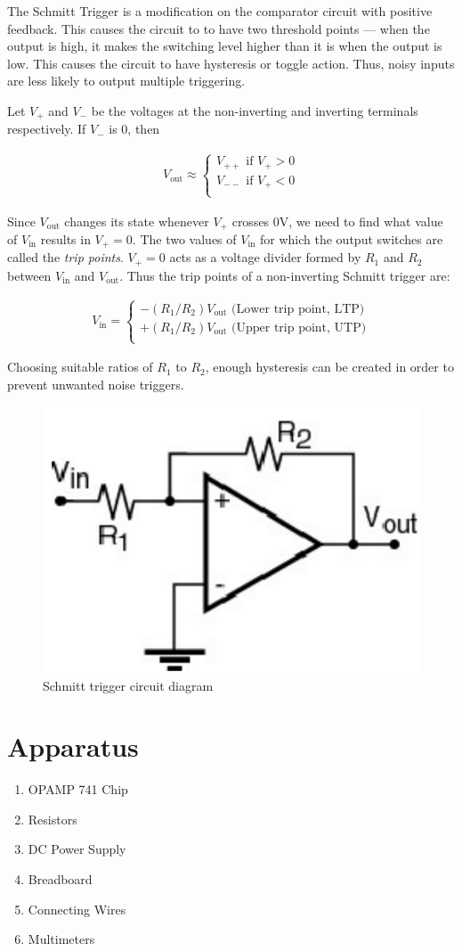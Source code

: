 The Schmitt Trigger is a modification on the comparator circuit with positive feedback. This causes the circuit to to have two threshold points --- when the output is high, it makes the switching level higher than it is when the output is low. This causes the circuit to have hysteresis or toggle action.
Thus, noisy inputs are less likely to output multiple triggering.

Let $V_+$ and $V_-$ be the voltages at the non-inverting and inverting terminals respectively. If $V_-$ is 0, then

\begin{align}
    V_\text{out} \approx \begin{cases}
        V_{++} \text{ if } V_+ > 0\\
        V_{--} \text{ if } V_+ < 0\\
    \end{cases}
\end{align}

Since $V_\text{out}$ changes its state whenever $V_+$ crosses 0V, we need to find what value of $V_\text{in}$ results in $V_+ = 0$. The two values of $V_\text{in}$ for which the output switches are called the \textit{trip points}. $V_+ = 0$ acts as a voltage divider formed by $R_1$ and $R_2$ between $V_\text{in}$ and $V_\text{out}$. Thus the trip points of a non-inverting Schmitt trigger are: 

\begin{align}
    V_\text{in} = \begin{cases}
        -(R_1/R_2)V_\text{out} \text{ (Lower trip point, LTP)}\\
        +(R_1/R_2)V_\text{out} \text{ (Upper trip point, UTP)}\\
    \end{cases}
\end{align}

Choosing suitable ratios of $R_1$ to $R_2$, enough hysteresis can be created in order to prevent unwanted noise triggers. 

\begin{figure}[H]
    \centering
    \includegraphics[width=0.5\columnwidth]{images/schmitt.png}
    \caption{Schmitt trigger circuit diagram}
    \label{schmitt}
\end{figure}

\section{Apparatus}

\begin{enumerate}
    \item OPAMP 741 Chip
    \item Resistors
    \item DC Power Supply
    \item Breadboard
    \item Connecting Wires
    \item Multimeters
\end{enumerate}